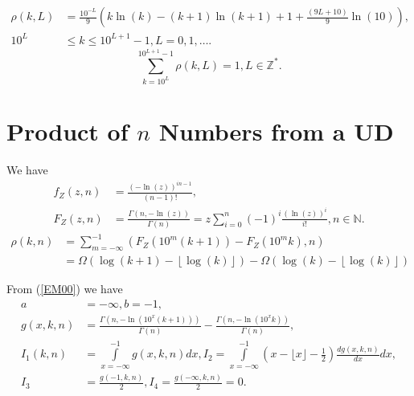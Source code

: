 \documentclass[titlepage,fleqn]{article}%
\providecommand{\U}[1]{\protect\rule{.1in}{.1in}}
\begin{document}
\begin{align*}
\rho(k,L)  &  =\frac{10^{-L}}{9}\left(  k\ln(k)-(k+1)\ln(k+1)+1+\frac{\left(
9L+10\right)  }{9}\ln(10)\right)  ,\\
10^{L}  &  \leq k\leq10^{L+1}-1,L=0,1,\ldots.
\end{align*}%
\[%
{\displaystyle\sum\limits_{k=10^{L}}^{10^{L+1}-1}}
\rho(k,L)=1,L\in%
\mathbb{Z}
^{\ast}.
\]


\section{Product of $n$ Numbers from a UD}%

\label{PRNUD}%


\bigskip

We have%
\begin{align*}
f_{Z}(z,n)  &  =\frac{(-\ln(z))^{in-1}}{\left(  n-1\right)  !},\\
F_{Z}(z,n)  &  =\frac{\Gamma(n,-\ln(z))}{\Gamma(n)}=z%
{\displaystyle\sum\limits_{i=0}^{n}}
(-1)^{i}\frac{(\ln(z))^{i}}{i!},n\in%
\mathbb{N}
.
\end{align*}%
\begin{align*}
\rho(k,n)  &  =%
{\displaystyle\sum\limits_{m=-\infty}^{-1}}
\left(  F_{Z}(10^{m}(k+1))-F_{Z}(10^{m}k),n\right) \\
&  =\Omega\left(  \log(k+1)-\left\lfloor \log(k)\right\rfloor \right)
-\Omega\left(  \log(k)-\left\lfloor \log(k)\right\rfloor \right)
\end{align*}


\bigskip From (\ref{EM00}) we have
\begin{align}
a  &  =-\infty,b=-1,\label{ProdN}\\
g(x,k,n)  &  =\frac{\Gamma(n,-\ln(10^{x}(k+1)))}{\Gamma(n)}-\frac
{\Gamma(n,-\ln(10^{x}k))}{\Gamma(n)},\nonumber\\
I_{1}(k,n)  &  =%
{\displaystyle\int\limits_{x=-\infty}^{-1}}
g(x,k,n)dx,I_{2}=%
{\displaystyle\int\limits_{x=-\infty}^{-1}}
\left(  x-\lfloor x\rfloor-\frac{1}{2}\right)  \frac{dg(x,k,n)}{dx}%
dx,\nonumber\\
I_{3}  &  =\frac{g(-1,k,n)}{2},I_{4}=\frac{g(-\infty,k,n)}{2}=0.\nonumber
\end{align}
\end{document}
